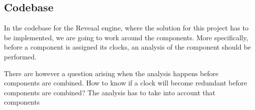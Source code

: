 \subsection{Codebase}
In the codebase for the Reveaal engine, where the solution for this project has to be implemented, we are going to work around the components. More specifically, before a component is assigned its clocks, an analysis of the component should be performed. 

There are however a question arising when the analysis happens before components are combined. How to know if a clock will become redundant before components are combined? The analysis has to take into account that components 